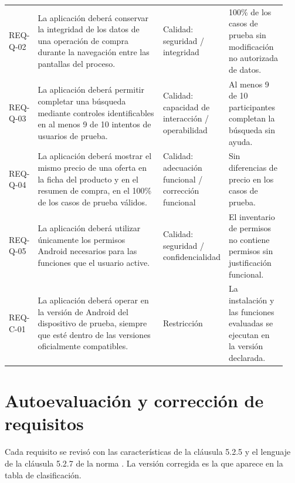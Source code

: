 \documentclass[10pt,a4paper]{article}
\begin{document}
\begin{longtable}{p{0.09\linewidth}p{0.48\linewidth}p{0.16\linewidth}p{0.21\linewidth}}
		REQ-Q-02 & La aplicación deberá conservar la integridad de los datos de una operación de compra durante la navegación entre las pantallas del proceso. & Calidad: seguridad / integridad & 100\% de los casos de prueba sin modificación no autorizada de datos.\\
		REQ-Q-03 & La aplicación deberá permitir completar una búsqueda mediante controles identificables en al menos 9 de 10 intentos de usuarios de prueba. & Calidad: capacidad de interacción / operabilidad & Al menos 9 de 10 participantes completan la búsqueda sin ayuda.\\
		REQ-Q-04 & La aplicación deberá mostrar el mismo precio de una oferta en la ficha del producto y en el resumen de compra, en el 100\% de los casos de prueba válidos. & Calidad: adecuación funcional / corrección funcional & Sin diferencias de precio en los casos de prueba.\\
		REQ-Q-05 & La aplicación deberá utilizar únicamente los permisos Android necesarios para las funciones que el usuario active. & Calidad: seguridad / confidencialidad & El inventario de permisos no contiene permisos sin justificación funcional.\\
		REQ-C-01 & La aplicación deberá operar en la versión de Android del dispositivo de prueba, siempre que esté dentro de las versiones oficialmente compatibles. & Restricción & La instalación y las funciones evaluadas se ejecutan en la versión declarada.\\
		\bottomrule
	\end{longtable}
	\normalsize
	
	\section{Autoevaluación y corrección de requisitos}
	
	Cada requisito se revisó con las características de la cláusula 5.2.5 y el lenguaje de la cláusula 5.2.7 de la norma \cite{iso29148}. La versión corregida es la que aparece en la tabla de clasificación.
	
\end{document}
